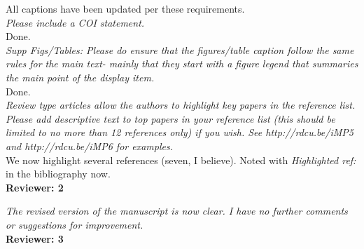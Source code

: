 \documentclass[11pt]{article}
\begin{document}
All captions have been updated per these requirements. \\

\emph{Please include a COI statement.}\\

Done. \\

\emph{Supp Figs/Tables: Please do ensure that the figures/table caption follow the same rules for the main text- mainly that they start with a figure legend that summaries the main point of the display item.}\\

Done.\\

\emph{Review type articles allow the authors to highlight key papers in the reference list. Please add descriptive text to top papers in
your reference list (this should be limited to no more than 12 references only) if you wish. See http://rdcu.be/iMP5 and http://rdcu.be/iMP6 for examples.}\\

We now highlight several references (seven, I believe). Noted with \emph{Highlighted ref:} in the bibliography now. \\ 

{\bf Reviewer: 2}

\emph{The revised version of the manuscript is now clear. I have no further comments or suggestions for improvement.}\\

{\bf Reviewer: 3}
\end{document}
